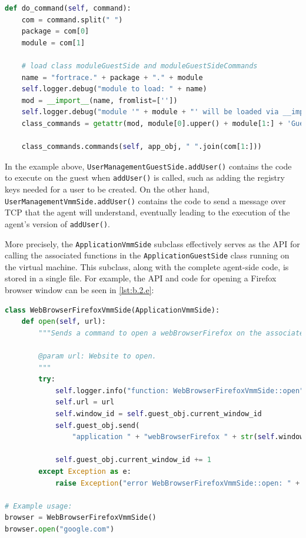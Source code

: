 \documentclass[letterpaper,12pt]{report}
\newcommand{\passthrough}[1]{#1}
\begin{document}
\begin{lstlisting}[label={lst:b.2.d}, caption={Demonstration of ForTrace agent module discovery and command execution}, language=Python]
def do_command(self, command):
    com = command.split(" ")
    package = com[0]
    module = com[1]

    # load class moduleGuestSide and moduleGuestSideCommands
    name = "fortrace." + package + "." + module
    self.logger.debug("module to load: " + name)
    mod = __import__(name, fromlist=[''])
    self.logger.debug("module '" + module + "' will be loaded via __import__")
    class_commands = getattr(mod, module[0].upper() + module[1:] + 'GuestSideCommands')
    
    class_commands.commands(self, app_obj, " ".join(com[1:]))
\end{lstlisting}

In the example above,
\passthrough{\lstinline!UserManagementGuestSide.addUser()!} contains the
code to execute on the guest when \passthrough{\lstinline!addUser()!} is
called, such as adding the registry keys needed for a user to be
created. On the other hand,
\passthrough{\lstinline!UserManagementVmmSide.addUser()!} contains the
code to send a message over TCP that the agent will understand,
eventually leading to the execution of the agent's version of
\passthrough{\lstinline!addUser()!}.

More precisely, the \passthrough{\lstinline!ApplicationVmmSide!}
subclass effectively serves as the API for calling the associated
functions in the \passthrough{\lstinline!ApplicationGuestSide!} class
running on the virtual machine. This subclass, along with the complete
agent-side code, is stored in a single file. For example, the API and
code for opening a Firefox browser window can be seen in
\autoref{lst:b.2.e}:

\begin{lstlisting}[label={lst:b.2.e}, caption={Sample ForTrace agent API implementation}, language=Python]
class WebBrowserFirefoxVmmSide(ApplicationVmmSide):
    def open(self, url):
        """Sends a command to open a webBrowserFirefox on the associated guest.

        @param url: Website to open.
        """
        try:
            self.logger.info("function: WebBrowserFirefoxVmmSide::open")
            self.url = url
            self.window_id = self.guest_obj.current_window_id
            self.guest_obj.send(
                "application " + "webBrowserFirefox " + str(self.window_id) + " open " + self.webBrowserFirefox + " " + self.url)

            self.guest_obj.current_window_id += 1
        except Exception as e:
            raise Exception("error WebBrowserFirefoxVmmSide::open: " + str(e))

# Example usage:
browser = WebBrowserFirefoxVmmSide()
browser.open("google.com")
\end{lstlisting}
\end{document}
